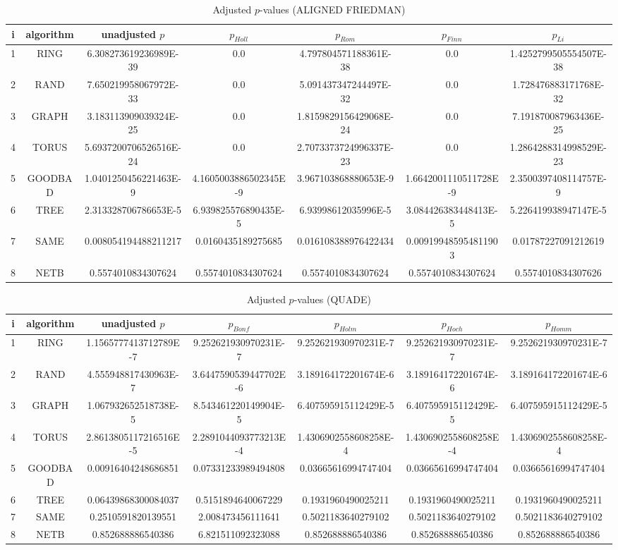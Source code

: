 \documentclass[a4paper,10pt]{article}
\begin{document}
\begin{landscape}
\begin{table}[!htp]
\centering\scriptsize
\caption{Adjusted $p$-values (ALIGNED FRIEDMAN)}
\begin{tabular}{ccccccc}
i&algorithm&unadjusted $p$&$p_{Holl}$&$p_{Rom}$&$p_{Finn}$&$p_{Li}$\\
\hline
1& RING&6.308273619236989E-39&0.0&4.797804571188361E-38&0.0&1.4252799505554507E-38\\
2& RAND&7.650219958067972E-33&0.0&5.091437347244497E-32&0.0&1.728476883171768E-32\\
3& GRAPH&3.183113909039324E-25&0.0&1.8159829156429068E-24&0.0&7.191870087963436E-25\\
4& TORUS&5.6937200706526516E-24&0.0&2.7073373724996337E-23&0.0&1.2864288314998529E-23\\
5& GOODBAD&1.0401250456221463E-9&4.1605003886502345E-9&3.967103868880653E-9&1.6642001110511728E-9&2.3500397408114757E-9\\
6& TREE&2.313328706786653E-5&6.939825576890435E-5&6.93998612035996E-5&3.084426383448413E-5&5.226419938947147E-5\\
7& SAME&0.008054194488211217&0.0160435189275685&0.016108388976422434&0.009199485954811903&0.01787227091212619\\
8& NETB&0.5574010834307624&0.5574010834307624&0.5574010834307624&0.5574010834307624&0.5574010834307626\\
\hline
\end{tabular}
\end{table}


\newpage

\begin{table}[!htp]
\centering\scriptsize
\caption{Adjusted $p$-values (QUADE)}
\begin{tabular}{ccccccc}
i&algorithm&unadjusted $p$&$p_{Bonf}$&$p_{Holm}$&$p_{Hoch}$&$p_{Homm}$\\
\hline
1& RING&1.1565777413712789E-7&9.252621930970231E-7&9.252621930970231E-7&9.252621930970231E-7&9.252621930970231E-7\\
2& RAND&4.555948817430963E-7&3.6447590539447702E-6&3.189164172201674E-6&3.189164172201674E-6&3.189164172201674E-6\\
3& GRAPH&1.067932652518738E-5&8.543461220149904E-5&6.407595915112429E-5&6.407595915112429E-5&6.407595915112429E-5\\
4& TORUS&2.8613805117216516E-5&2.2891044093773213E-4&1.4306902558608258E-4&1.4306902558608258E-4&1.4306902558608258E-4\\
5& GOODBAD&0.00916404248686851&0.07331233989494808&0.03665616994747404&0.03665616994747404&0.03665616994747404\\
6& TREE&0.06439868300084037&0.5151894640067229&0.1931960490025211&0.1931960490025211&0.1931960490025211\\
7& SAME&0.2510591820139551&2.008473456111641&0.5021183640279102&0.5021183640279102&0.5021183640279102\\
8& NETB&0.852688886540386&6.821511092323088&0.852688886540386&0.852688886540386&0.852688886540386\\
\hline
\end{tabular}
\end{table}


\end{landscape}
\end{document}
